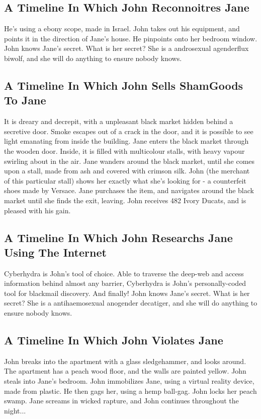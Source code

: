\documentclass{article}
\begin{document}
\subsection{A Timeline In Which John Reconnoitres Jane}


He's using a ebony scope, made in Israel.
John takes out his equipment, and points it in the direction of Jane's house. He pinpoints onto her bedroom window.
John knows Jane's secret. What is her secret? She is a androsexual agenderflux biwolf, and she will do anything to ensure nobody knows.
\subsection{A Timeline In Which John Sells ShamGoods To Jane}


It is dreary and decrepit, with a unpleasant black market hidden behind a secretive door.
Smoke escapes out of a crack in the door, and it is possible to see light emanating from inside the building.
Jane enters the black market through the wooden door.
Inside, it is filled with multicolour stalls, with heavy vapour swirling about in the air.
Jane wanders around the black market, until she comes upon a stall, made from ash and covered with crimson silk.
John (the merchant of this particular stall) shows her exactly what she's looking for {-} a counterfeit shoes made by Versace.
Jane purchases the item, and navigates around the black market until she finds the exit, leaving.
John receives 482 Ivory Ducats, and is pleased with his gain.
\subsection{A Timeline In Which John Researchs Jane Using The Internet}


Cyberhydra is John's tool of choice. Able to traverse the deep{-}web and access information behind almost any barrier, Cyberhydra is John's personally{-}coded tool for blackmail discovery.
And finally!
John knows Jane's secret. What is her secret? She is a antihaemosexual anogender decatiger, and she will do anything to ensure nobody knows.
\subsection{A Timeline In Which John Violates Jane}


John breaks into the apartment with a glass sledgehammer, and looks around.
The apartment has a peach wood floor, and the walls are painted yellow.
John steals into Jane's bedroom.
John immobilizes Jane, using a virtual reality device, made from plastic.
He then gags her, using a hemp ball{-}gag.
John locks her peach swamp.
Jane screams in wicked rapture, and John continues throughout the night...
\end{document}
